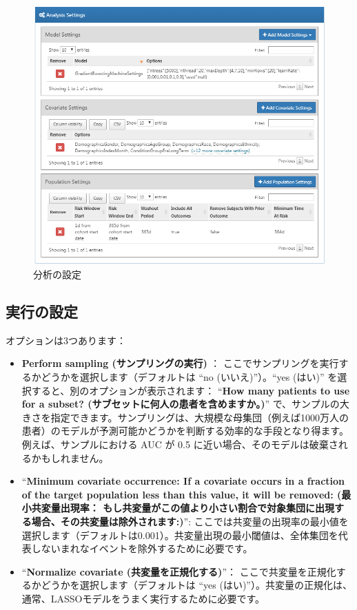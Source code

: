 \documentclass[
  11pt]{book}
\theoremstyle{definition}
\theoremstyle{definition}
\theoremstyle{definition}
\theoremstyle{definition}
\theoremstyle{remark}
\begin{document}
\begin{figure}

{\centering \includegraphics[width=1\linewidth]{images/PatientLevelPrediction/analysisSettings} 

}

\caption{分析の設定}\label{fig:analysisSettings}
\end{figure}

\subsection{実行の設定}\label{ux5b9fux884cux306eux8a2dux5b9a}

オプションは3つあります：

\begin{itemize}
\item
  \textbf{Perform sampling (サンプリングの実行)} ： ここでサンプリングを実行するかどうかを選択します（デフォルトは ``no (いいえ)''）。``yes (はい)'' を選択すると、別のオプションが表示されます： ``\textbf{How many patients to use for a subset? (サブセットに何人の患者を含めますか。)}'' で、サンプルの大きさを指定できます。サンプリングは、大規模な母集団（例えば1000万人の患者）のモデルが予測可能かどうかを判断する効率的な手段となり得ます。例えば、サンプルにおける AUC が 0.5 に近い場合、そのモデルは破棄されるかもしれません。
\item
  ``\textbf{Minimum covariate occurrence: If a covariate occurs in a fraction of the target population less than this value, it will be removed: (最小共変量出現率： もし共変量がこの値より小さい割合で対象集団に出現する場合、その共変量は除外されます:)}'': ここでは共変量の出現率の最小値を選択します（デフォルトは0.001）。共変量出現の最小閾値は、全体集団を代表しないまれなイベントを除外するために必要です。
\item
  ``\textbf{Normalize covariate (共変量を正規化する)}''： ここで共変量を正規化するかどうかを選択します（デフォルトは ``yes (はい)''）。共変量の正規化は、通常、LASSOモデルをうまく実行するために必要です。
\end{itemize}
\end{document}
